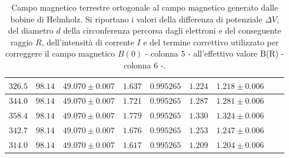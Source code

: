 \documentclass[]{article}
\begin{document}
\begin{table}[H]
\begin{tabular}{||c|c|c|c|c|c|c|c|c||}
    $326.5$ & $98.14$ & $49.070 \pm 0.007$ & $1.637$ & $0.995265$ & $1.224$ & $1.218 \pm 0.006$ \\\hline
    $344.0$ & $98.14$ & $49.070 \pm 0.007$ & $1.721$ & $0.995265$ & $1.287$ & $1.281 \pm 0.006$ \\\hline
    $358.4$ & $98.14$ & $49.070 \pm 0.007$ & $1.779$ & $0.995265$ & $1.330$ & $1.324 \pm 0.006$ \\\hline
    $342.7$ & $98.14$ & $49.070 \pm 0.007$ & $1.676$ & $0.995265$ & $1.253$ & $1.247 \pm 0.006$ \\\hline
    $314.0$ & $98.14$ & $49.070 \pm 0.007$ & $1.617$ & $0.995265$ & $1.209$ & $1.204 \pm 0.006$ \\\hline
    
    \end{tabular}
    \caption{Campo magnetico terrestre ortogonale al campo magnetico generato dalle bobine di Helmholz. Si riportano i valori della differenza di potenziale $\Delta V$, del diametro $ d $ della circonferenza percorsa dagli elettroni e del conseguente raggio $ R $, dell'intensità di corrente $ I $ e del termine correttivo utilizzato per correggere il campo magnetico $B(0)$ - colonna 5 - all'effettivo valore B(R) - colonna 6 -.}
    \label{CM_ortogonale}
\end{table}
\end{document}
